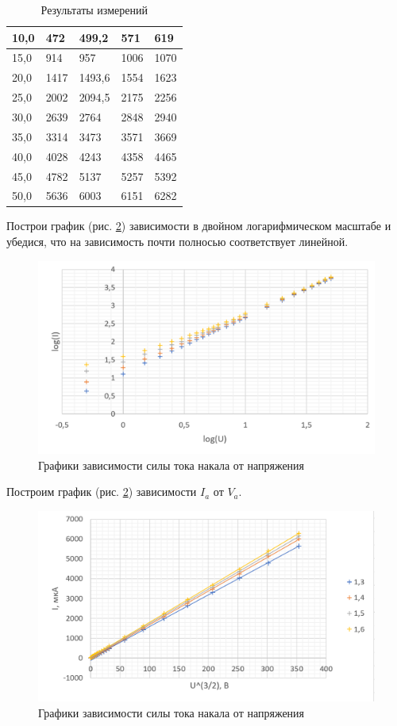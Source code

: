 \documentclass[a4paper, 12pt]{article}
\begin{document}
\begin{table}[H]
\begin{tabular}{|l|l|l|l|l|}
        10,0 & 472  & 499,2  & 571  & 619  \\ \hline
        15,0 & 914  & 957  & 1006  & 1070  \\ \hline
        20,0 & 1417  & 1493,6  & 1554  & 1623  \\ \hline
        25,0 & 2002  & 2094,5  & 2175  & 2256  \\ \hline
        30,0 & 2639  & 2764  & 2848  & 2940  \\ \hline
        35,0 & 3314  & 3473  & 3571  & 3669  \\ \hline
        40,0 & 4028  & 4243  & 4358  & 4465  \\ \hline
        45,0 &4782  & 5137  & 5257  & 5392  \\ \hline
        50,0 & 5636  & 6003  & 6151  & 6282  \\ \hline
		\end{tabular}
		\caption{Результаты измерений}
		\label{res}
	\end{table}
	Построи график (рис. \ref{граф}) зависимости в двойном логарифмическом масштабе и убедися, что на зависимость почти полносью соответствует линейной.
    
    \begin{figure}[H]
		\centering
		\includegraphics[scale=0.4]{log.png}
		\caption{Графики зависимости силы тока накала от напряжения}
		\label{граф}
	\end{figure}
    
    
	Построим график (рис. \ref{граф}) зависимости $I_a$ от $V_a$. 
	
	\begin{figure}[H]
		\centering
		\includegraphics[scale=0.7]{graph_3_2.png}
		\caption{Графики зависимости силы тока накала от напряжения}
		\label{граф}
	\end{figure}
	
\end{document}
